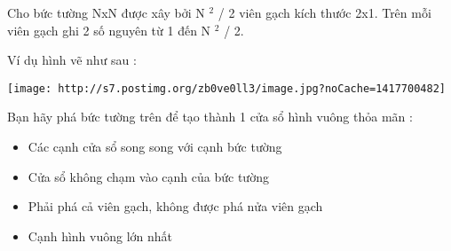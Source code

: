 Cho bức tường NxN được xây bởi N $^ 2 $ / 2 viên gạch kích thước 2x1. Trên mỗi viên gạch ghi 2 số nguyên từ 1 đến N $^ 2 $ / 2.

Ví dụ hình vẽ như sau :


\texttt{[image: http://s7.postimg.org/zb0ve0ll3/image.jpg?noCache=1417700482]}

Bạn hãy phá bức tường trên để tạo thành 1 cửa sổ hình vuông thỏa mãn :
\begin{itemize}
	\item Các cạnh cửa sổ song song với cạnh bức tường
	\item Cửa sổ không chạm vào cạnh của bức tường
	\item Phải phá cả viên gạch, không được phá nửa viên gạch
	\item Cạnh hình vuông lớn nhất
\end{itemize}

\